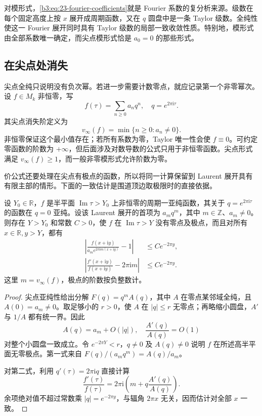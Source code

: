 对模形式，\eqref{b3:eq:23-fourier-coefficients}就是 Fourier 系数的复分析来源。级数在每个固定高度上按 \(x\) 展开成周期函数，又在 \(q\) 圆盘中是一条 Taylor 级数。全纯性使这一 Fourier 展开同时具有 Taylor 级数的局部一致收敛性质。特别地，模形式由全部系数唯一确定，而尖点模形式恰是 \(a_0=0\) 的那些形式。

\subsection{在尖点处消失}
\label{b3:subsec:230305}

尖点全纯只说明没有负次幂。若进一步需要计数零点，就应记录第一个非零幂次。设 \(f\in M_k\) 非恒零，写
\[
 f(\tau)=\sum_{n\ge0}a_nq^n,
 \quad q=e^{2\pi\mathrm{i}\tau}.
\]
其尖点消失阶定义为
\[
 v_\infty(f)=\min\{n\ge0:a_n\ne0\}.
\]
非恒零保证这个最小值存在；若所有系数为零，Taylor 唯一性会使 \(f\equiv0\)。可约定零函数的阶数为 \(+\infty\)，但后面涉及对数导数的公式只用于非恒零函数。尖点形式满足 \(v_\infty(f)\ge1\)，而一般非零模形式允许阶数为零。

价公式还要处理在尖点有极点的函数，所以将同一计算保留到 Laurent 展开具有有限主部的情形。下面的一致估计是围道顶边取极限时的直接依据。

\begin{proposition}[尖点阶数与对数导数]\label{b3:prop:23-cusp-order-estimate}
设 \(Y_0\in\mathbb R\)，\(f\) 是半平面 \(\operatorname{Im}\tau>Y_0\) 上非恒零的周期一亚纯函数，其关于 \(q=e^{2\pi\mathrm{i}\tau}\) 的函数在 \(q=0\) 亚纯。设该 Laurent 展开的首项为 \(a_mq^m\)，其中 \(m\in\mathbb Z\)、\(a_m\ne0\)。则存在 \(Y>Y_0\) 和常数 \(C>0\)，使 \(f\) 在 \(\operatorname{Im}\tau>Y\) 没有零点及极点，而且对所有 \(x\in\mathbb R,y>Y\)，都有
\begin{align}
 \left|\frac{f(x+\mathrm{i}y)}{a_m e^{2\pi\mathrm{i}m(x+\mathrm{i}y)}}-1\right|
 &\le Ce^{-2\pi y},\label{b3:eq:23-cusp-leading-term}\\
 \left|\frac{f'(x+\mathrm{i}y)}{f(x+\mathrm{i}y)}-2\pi\mathrm{i}m\right|
 &\le Ce^{-2\pi y}.\label{b3:eq:23-cusp-log-derivative}
\end{align}
这里 \(m=v_\infty(f)\)，极点的阶数按负整数计。
\end{proposition}
\begin{proof}
尖点亚纯性给出分解 \(F(q)=q^mA(q)\)，其中 \(A\) 在零点某邻域全纯，且 \(A(0)=a_m\ne0\)。取足够小的 \(r>0\)，使 \(A\) 在 \(|q|\le r\) 无零点；再略缩小圆盘，\(A'\) 与 \(1/A\) 都有统一界。因此
\[
 A(q)=a_m+O(|q|),\quad
 \frac{A'(q)}{A(q)}=O(1)
\]
对整个小圆盘一致成立。令 \(e^{-2\pi Y}<r\)，\(q\ne0\) 及 \(A(q)\ne0\) 说明 \(f\) 在所述高半平面无零极点。第一式来自 \(F(q)/(a_mq^m)=A(q)/a_m\)。

对第二式，利用 \(q'(\tau)=2\pi\mathrm{i}q\) 直接计算
\[
 \frac{f'(\tau)}{f(\tau)}
 =2\pi\mathrm{i}\left(m+q\frac{A'(q)}{A(q)}\right).
\]
余项绝对值不超过常数乘 \(|q|=e^{-2\pi y}\)，与辐角 \(2\pi x\) 无关，因而估计对全部 \(x\) 一致。
\end{proof}

